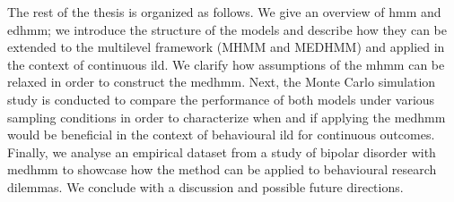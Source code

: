The rest of the thesis is organized as follows. We give an overview of \ac{hmm} and \ac{edhmm}; we introduce the structure of the models and describe how they can be extended to the multilevel framework (MHMM and MEDHMM) and applied in the context of continuous \ac{ild}. We clarify how assumptions of the \ac{mhmm} can be relaxed in order to construct the \ac{medhmm}. Next, the Monte Carlo simulation study is conducted to compare the performance of both models under various sampling conditions in order to characterize when and if applying the \ac{medhmm} would be beneficial in the context of behavioural \ac{ild} for continuous outcomes. Finally, we analyse an empirical dataset from a study of bipolar disorder with \ac{medhmm} to showcase how the method can be applied to behavioural research dilemmas. We conclude with a discussion and possible future directions. 

